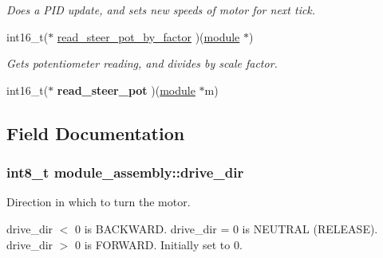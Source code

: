 \begin{DoxyCompactItemize}
\begin{DoxyCompactList}\small\item\em Does a P\+I\+D update, and sets new speeds of motor for next tick. \end{DoxyCompactList}\item 
\hypertarget{structmodule__assembly_ae927c8ea866d3fe3fd4b13f33c585378}{}int16\+\_\+t($\ast$ \hyperlink{structmodule__assembly_ae927c8ea866d3fe3fd4b13f33c585378}{read\+\_\+steer\+\_\+pot\+\_\+by\+\_\+factor} )(\hyperlink{structmodule__assembly}{module} $\ast$)\label{structmodule__assembly_ae927c8ea866d3fe3fd4b13f33c585378}

\begin{DoxyCompactList}\small\item\em Gets potentiometer reading, and divides by scale factor. \end{DoxyCompactList}\item 
\hypertarget{structmodule__assembly_a8ca2a2c29b9fabeadc95b352bbf18817}{}int16\+\_\+t($\ast$ {\bfseries read\+\_\+steer\+\_\+pot} )(\hyperlink{structmodule__assembly}{module} $\ast$m)\label{structmodule__assembly_a8ca2a2c29b9fabeadc95b352bbf18817}

\end{DoxyCompactItemize}


\subsection{Field Documentation}
\hypertarget{structmodule__assembly_a4eaba2980fc35d71f1cc2ec15251cf15}{}
\subsubsection[{drive\+\_\+dir}]{\setlength{\rightskip}{0pt plus 5cm}int8\+\_\+t module\+\_\+assembly\+::drive\+\_\+dir}\label{structmodule__assembly_a4eaba2980fc35d71f1cc2ec15251cf15}


Direction in which to turn the motor. 

drive\+\_\+dir $<$ 0 is B\+A\+C\+K\+W\+A\+R\+D. drive\+\_\+dir = 0 is N\+E\+U\+T\+R\+A\+L (R\+E\+L\+E\+A\+S\+E). drive\+\_\+dir $>$ 0 is F\+O\+R\+W\+A\+R\+D. Initially set to 0. \hypertarget{structmodule__assembly_a1c4ce1de4be6b0d640e508245ac5f281}{}
